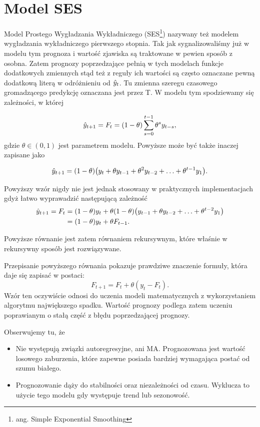 \documentclass[10pt,a4paper]{book}
\begin{document}
\section{Model SES}

Model Prostego Wygładzania Wykładniczego (SES\footnote{ang. Simple Exponential Smoothing}) nazywany też modelem wygładzania wykładniczego pierwszego stopnia. Tak jak sygnalizowaliśmy już w modelu tym prognoza i wartość zjawiska są traktowane w pewien sposób z osobna. Zatem prognozy poprzedzające pełnią w tych modelach funkcje dodatkowych zmiennych stąd też z reguły ich wartości są często oznaczane pewną dodatkową literą w odróżnieniu od $\predict{y}{t}$. Tu zmienna szeregu czasowego gromadzącego predykcję oznaczana jest przez T.  W modelu tym spodziewamy się zależności,  w której

$$
\predict{y}{t+1} =  F_t = (1 - \theta) \sum_{s=0}^{t-1} \theta^s y_{t-s},
$$
gdzie $\theta \in (0,1)$ jest parametrem modelu. Powyższe może być także inaczej zapisane jako

$$
\predict{y}{t+1} = (1- \theta) \bracket{ y_t + \theta y_{t-1} + \theta^2 y_{t-2}+ \ldots + \theta^{t-1} y_{1}}.
$$

Powyższy wzór nigdy nie jest jednak stosowany w praktycznych implementacjach gdyż łatwo wyprawadzić następującą zależność 
\begin{align*}
\predict{y}{t+1} = F_t &= (1-\theta) y_t + \theta (1-\theta) \bracket{y_{t-1} + \theta y_{t-2} + \ldots + \theta^{t-2} y_1} \\
&=  (1-\theta ) y_t + \theta F_{t-1}. 
\end{align*}

Powyższe równanie jest zatem równaniem rekursywnym, które właśnie w rekursywny sposób jest rozwiązywane.

Przepisanie powyższego równania pokazuje prawdziwe znaczenie formuły, która daje się zapisać w postaci:
$$
F_{t+1} = F_{t} + \theta (y_t - F_t).
$$
Wzór ten oczywiście odnosi do uczenia modeli matematycznych z wykorzystaniem algorytmu największego spadku. Wartość prognozy podlega zatem uczeniu poprawianym o stałą część z błędu poprzedzającej prognozy.

Obserwujemy tu, że 
\begin{itemize}
\item Nie występują związki autoregresyjne, ani MA. Prognozowana jest wartość losowego zaburzenia, które zapewne posiada bardziej wymagająca postać od szumu białego.
\item Prognozowanie dąży do stabilności oraz niezależności od czasu. Wyklucza to użycie tego modelu gdy występuje trend lub sezonowość.
\end{itemize}
\end{document}
